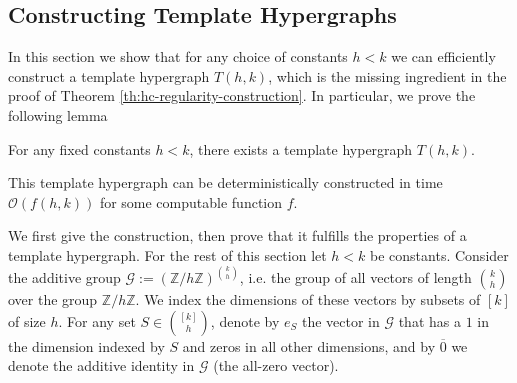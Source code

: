 \documentclass[a4paper,UKenglish,cleveref, autoref, thm-restate,numberwithinsect]{lipics-v2021}
\newcommand{\bigO}{\mathcal{O}}
\newcommand{\G}{\mathcal{G}}
\begin{document}
\subsection{Constructing Template Hypergraphs} \label{sec:template-graphs}
In this section we show that for any choice of constants $h<k$ we can efficiently construct a template hypergraph $T(h,k)$, which is the missing ingredient in the proof of Theorem \ref{th:hc-regularity-construction}. In particular, we prove the following lemma
\begin{lemma}\label{lemma:template-graph-construction}
    For any fixed constants $h<k$, there exists a template hypergraph $T(h,k)$.
\end{lemma}
This template hypergraph can be deterministically constructed in time $\bigO(f(h,k))$ for some computable function $f$. 

We first give the construction, then prove that it fulfills the properties of a template hypergraph.
For the rest of this section let $h < k$ be constants. Consider the additive group $\G := \left(\mathbb Z/h\mathbb Z\right)^{\binom{k}{h}}$, i.e. the group of all vectors of length $\binom{k}{h}$ over the group $\mathbb Z/h\mathbb Z$. We index the dimensions of these vectors by subsets of $[k]$ of size $h$.
For any set $S\in \binom{[k]}{h}$, denote by $e_S$ the vector in $\G$ that has a $1$ in the dimension indexed by $S$ and zeros in all other dimensions, and by $\overline 0$ we denote the additive identity in $\G$ (the all-zero vector). 
\end{document}
